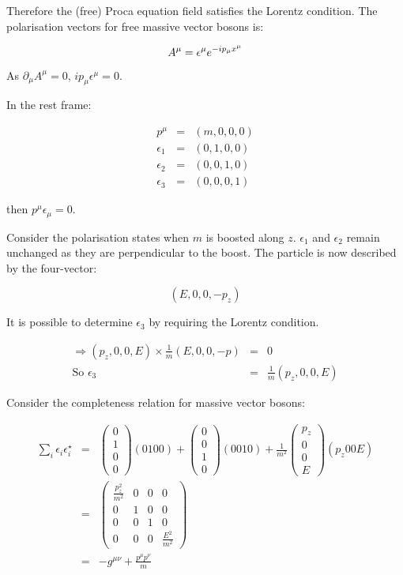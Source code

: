 Therefore the (free) Proca equation field satisfies the Lorentz condition.  The polarisation vectors for free massive vector bosons is:

\[
  A^{\mu} = \epsilon^{\mu}e^{-ip_{\mu}x^{\mu}}
\]

As $\partial_{\mu}A^{\mu} = 0$, $ip_{\mu}\epsilon^{\mu} = 0$.

In the rest frame:

\begin{eqnarray*}
  p^{\mu}    & = & (m,0,0,0) \\
  \epsilon_1 & = & (0,1,0,0) \\
  \epsilon_2 & = & (0,0,1,0) \\
  \epsilon_3 & = & (0,0,0,1)
\end{eqnarray*}

then $p^{\mu}\epsilon_{\mu} = 0$.

Consider the polarisation states when $m$ is boosted along $z$.  $\epsilon_1$ and $\epsilon_2$ remain unchanged as they are perpendicular to the boost.  The particle is now described by the four-vector:

\[
  (E,0,0,-p_z)
\]

It is possible to determine $\epsilon_3$ by requiring the Lorentz condition.

\begin{eqnarray*}
  \Rightarrow (p_z,0,0,E)\times\frac{1}{m}(E,0,0,-p) & = & 0 \\
  \textrm{So } \epsilon_3 & = & \frac{1}{m}(p_z,0,0,E)
\end{eqnarray*}

Consider the completeness relation for massive vector bosons:

\begin{eqnarray*}
  \sum_i \epsilon_i\epsilon_i^{\star} & = &
  \left(
    \begin{array}{c}
    0 \\
    1 \\
    0 \\
    0
    \end{array}
  \right)
  (0 1 0 0)
  + 
  \left(
    \begin{array}{c}
    0 \\
    0 \\
    1 \\
    0
    \end{array}
  \right)
  (0 0 1 0)
  + \frac{1}{m^2}
  \left(
    \begin{array}{c}
    p_z \\
    0 \\
    0 \\
    E
    \end{array}
  \right)
  (p_z 0 0 E)
  \\
  & = &
  \left(
    \begin{array}{cccc}
    \frac{p_z^2}{m^2} & 0 & 0 & 0 \\
    0 & 1 & 0 & 0 \\
    0 & 0 & 1 & 0 \\
    0 & 0 & 0 & \frac{E^2}{m^2}
    \end{array}
  \right)
  \\
  & = & -g^{\mu\nu} + \frac{p^{\mu}p^{\nu}}{m}
\end{eqnarray*}

